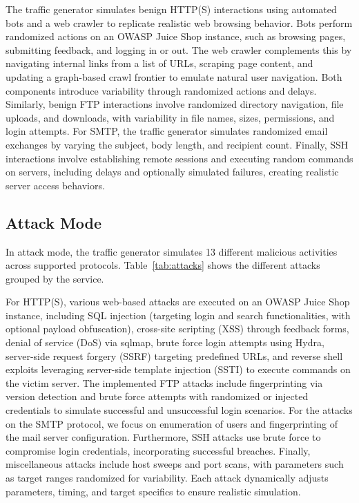 The traffic generator simulates benign HTTP(S) interactions using automated bots and a web crawler to replicate realistic web browsing behavior. Bots perform randomized actions on an OWASP Juice Shop instance, such as browsing pages, submitting feedback, and logging in or out. The web crawler complements this by navigating internal links from a list of URLs, scraping page content, and updating a graph-based crawl frontier to emulate natural user navigation. Both components introduce variability through randomized actions and delays. 
Similarly, benign FTP interactions involve randomized directory navigation, file uploads, and downloads, with variability in file names, sizes, permissions, and login attempts.
For SMTP, the traffic generator simulates randomized email exchanges by varying the subject, body length, and recipient count.
Finally, SSH interactions involve establishing remote sessions and executing random commands on servers, including delays and optionally simulated failures, creating realistic server access behaviors.

\subsection{Attack Mode}
In attack mode, the traffic generator simulates 13 different malicious activities across supported protocols. Table~\ref{tab:attacks} shows the different attacks grouped by the service.

For HTTP(S), various web-based attacks are executed on an OWASP Juice Shop instance, including SQL injection (targeting login and search functionalities, with optional payload obfuscation), cross-site scripting (XSS) through feedback forms, denial of service (DoS) via sqlmap, brute force login attempts using Hydra, server-side request forgery (SSRF) targeting predefined URLs, and reverse shell exploits leveraging server-side template injection (SSTI) to execute commands on the victim server. The implemented FTP attacks include fingerprinting via version detection and brute force attempts with randomized or injected credentials to simulate successful and unsuccessful login scenarios. For the attacks on the SMTP protocol, we focus on enumeration of users and fingerprinting of the mail server configuration. Furthermore, SSH attacks use brute force to compromise login credentials, incorporating successful breaches. Finally, miscellaneous attacks include host sweeps and port scans, with parameters such as target ranges randomized for variability. Each attack dynamically adjusts parameters, timing, and target specifics to ensure realistic simulation.

